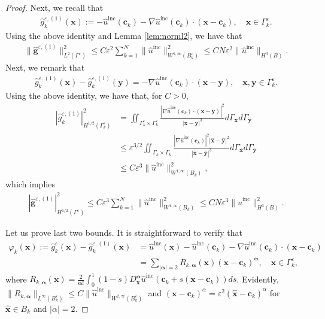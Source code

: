 \documentclass[]{article}
\numberwithin{equation}{section}
\numberwithin{theorem}{section}
\numberwithin{lemma}{section}
\numberwithin{corollary}{section}
\numberwithin{proposition}{section}
\numberwithin{definition}{section}
\newcommand{\bx}{\boldsymbol{x}}
\newcommand{\by}{\boldsymbol{y}}
\newcommand{\bc}{\boldsymbol{c}}
\newcommand{\re}{\varepsilon}
\renewcommand{\vec}{\boldsymbol}
\newcommand{\inc}{\operatorname{inc}}
\begin{document}
\begin{appendices}
\begin{proof}
			Next, we recall that 
			\begin{align*}
				\hat{g}^{\re, (1)}_k(\bx) := - \hat{u}^{\inc}(\bc_k) - \nabla \hat{u}^{\inc}(\bc_k) \cdot (\bx - \bc_k), \quad \bx \in \Gamma^{\re}_k.
			\end{align*}
			Using the above identity and Lemma \ref{lem:norml2}, we have that 
			\begin{align*}
				\| \hat{\vec{g}}^{\re, (1)} \|^2_{L^2(\Gamma^{\re})} \leq C \re^2 \sum_{k=1}^N \| \hat{u}^{\inc} \|^2_{W^{1, \infty}(B^{\re}_k)} \leq C N \re^2 \| \hat{u}^{\inc} \|_{H^{3}(B)}.
			\end{align*}
			Next, we remark that
			\begin{align*}
				\hat{g}^{\re, (1)}_k(\bx) - \hat{g}^{\re, (1)}_k(\by) = - \nabla \hat{u}^{\inc}(\bc_k) \cdot (\bx -\by), \quad \bx, \by \in \Gamma^{\re}_k.
			\end{align*} 
			Using the above identity, we have that, for $C>0$,
			\begin{align*}
				|\hat{g}^{\re, (1)}_k|^2_{H^{1/2}(\Gamma^{\re}_k)} &= \iint_{\Gamma^{\re}_k \times \Gamma^{\re}_k} \frac{|\nabla \hat{u}^{\inc}(\bc_k) \cdot (\bx -\by)|^2}{|\bx-\by|^3} d\Gamma_{\bx} d\Gamma_{\by}    \\
				& \leq \re^{3/2} \iint_{\Gamma_k \times \Gamma_k} \frac{|\nabla \hat{u}^{\inc}(\bc_k) |^2  |\hat{\bx} -\hat{\by}|^2}{|\hat{\bx}-\hat{\by}|^3} d\Gamma_{\hat{\bx}} d\Gamma_{\hat{\by}} \\
				&\leq C \re^3 \| \hat{u}^{\inc}  \|^2_{W^{1,\infty}(B_k)},
			\end{align*}
			which implies 
			\begin{align*}
				| \hat{\vec{g}}^{\re, (1)} |^2_{H^{1/2}(\Gamma^{\re})} \leq  C \re^3 \sum_{k=1}^N \| \hat{u}^{\inc}  \|^2_{W^{1,\infty}(B_k)} \leq C N \re^{3} \| \hat{u}^{\inc}  \|^2_{H^{3}(B)}.
			\end{align*}
			
			Let us prove last two bounds. It is straightforward to verify that 
			\begin{align*}%
				\varphi_k(\bx) := \hat{g}_k^{\re}(\bx)-\hat{g}_k^{\re,(1)}(\bx)&=\hat{u}^{\inc}(\bx)-\hat{u}^{\inc}(\bc_k)-\nabla \hat{u}^{\inc}(\bc_k)\cdot(\vec{x}-\vec{c}_k) \\&=\sum\limits_{|\vec{\alpha}|=2}R_{k,\vec{\alpha}}(\bx) (\vec{x}-\vec{c}_k)^{\vec{\alpha}}, \quad \bx \in \Gamma^{\re}_k,
			\end{align*} 
			where $R_{k,\vec{\alpha}}(\vec{x})=\frac{2}{\vec{\alpha}!}\int_0^1(1-s)D^{\vec{\alpha}}_{\vec{x}}\hat{u}^{\inc}(\vec{c}_k+s(\vec{x}-\vec{c}_k))ds$. Evidently, $\|R_{k,\vec{\alpha}}\|_{L^{\infty}(B^{\re}_k)}\leq  C \|\hat{u}^{\inc}\|_{W^{2,\infty}(B^{\re}_k)}$ and $(\bx-\bc_k)^{\alpha} = \re^2 (\hat{\bx}-\bc_k)^{\alpha}$ for $\hat{\bx} \in B_{k}$ and $|\alpha|=2$. 
			

\end{proof}
\end{appendices}
\end{document}
